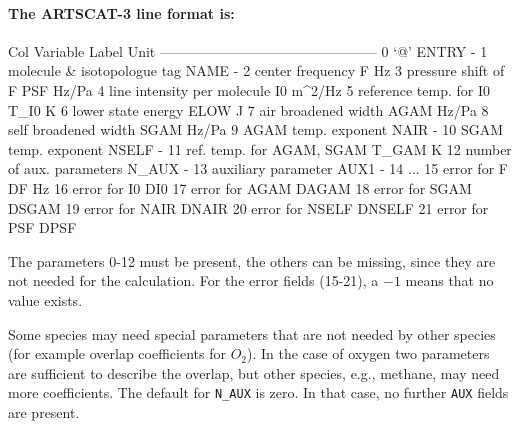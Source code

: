 \paragraph*{The ARTSCAT-3 line format is:}
\begin{code}

Col  Variable                     Label    Unit     
-----------------------------------------------      
 0   `@'                         ENTRY        -     
 1   molecule & isotopologue tag  NAME        -
 2   center frequency                F       Hz     
 3   pressure shift of F           PSF    Hz/Pa    
 4   line intensity per molecule    I0   m^2/Hz     
 5   reference temp. for I0       T_I0        K
 6   lower state energy           ELOW        J    
 7   air broadened width          AGAM    Hz/Pa     
 8   self broadened width         SGAM    Hz/Pa
 9   AGAM temp. exponent          NAIR        -     
10   SGAM temp. exponent         NSELF        - 
11   ref. temp. for AGAM, SGAM   T_GAM        K
12   number of aux. parameters   N_AUX        -
13   auxiliary parameter          AUX1        -
14   ... 
15   error for F                    DF       Hz
16   error for I0                  DI0    %
17   error for AGAM              DAGAM    %
18   error for SGAM              DSGAM    %
19   error for NAIR              DNAIR    %
20   error for NSELF            DNSELF    %
21   error for PSF                DPSF    %

\end{code}
The parameters 0-12 must be present, the others can be missing, since
they are not needed for the calculation. For the error fields (15-21),
a $-1$ means that no value exists.

Some species may need special parameters that are not needed by other
species (for example overlap coefficients for $O_2$). In the case of
oxygen two parameters are sufficient to describe the overlap, but
other species, e.g., methane, may need more coefficients. The default
for \texttt{N\_AUX} is zero. In that case, no further \texttt{AUX}
fields are present.

